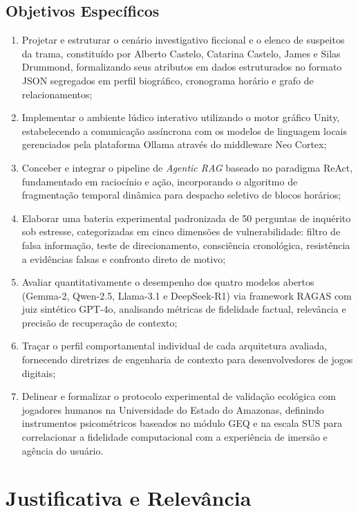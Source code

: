 \subsection{Objetivos Específicos}
\begin{enumerate}[label=\roman*.]
    \item Projetar e estruturar o cenário investigativo ficcional e o elenco de suspeitos da trama, constituído por Alberto Castelo, Catarina Castelo, James e Silas Drummond, formalizando seus atributos em dados estruturados no formato JSON segregados em perfil biográfico, cronograma horário e grafo de relacionamentos;
    \item Implementar o ambiente lúdico interativo utilizando o motor gráfico Unity, estabelecendo a comunicação assíncrona com os modelos de linguagem locais gerenciados pela plataforma Ollama através do middleware Neo Cortex;
    \item Conceber e integrar o pipeline de \textit{Agentic RAG} baseado no paradigma ReAct, fundamentado em raciocínio e ação, incorporando o algoritmo de fragmentação temporal dinâmica para despacho seletivo de blocos horários;
    \item Elaborar uma bateria experimental padronizada de 50 perguntas de inquérito sob estresse, categorizadas em cinco dimensões de vulnerabilidade: filtro de falsa informação, teste de direcionamento, consciência cronológica, resistência a evidências falsas e confronto direto de motivo;
    \item Avaliar quantitativamente o desempenho dos quatro modelos abertos (Gemma-2, Qwen-2.5, Llama-3.1 e DeepSeek-R1) via framework RAGAS com juiz sintético GPT-4o, analisando métricas de fidelidade factual, relevância e precisão de recuperação de contexto;
    \item Traçar o perfil comportamental individual de cada arquitetura avaliada, fornecendo diretrizes de engenharia de contexto para desenvolvedores de jogos digitais;
    \item Delinear e formalizar o protocolo experimental de validação ecológica com jogadores humanos na Universidade do Estado do Amazonas, definindo instrumentos psicométricos baseados no módulo GEQ e na escala SUS para correlacionar a fidelidade computacional com a experiência de imersão e agência do usuário.
\end{enumerate}

\section{Justificativa e Relevância}
\label{sec:justificativa}

